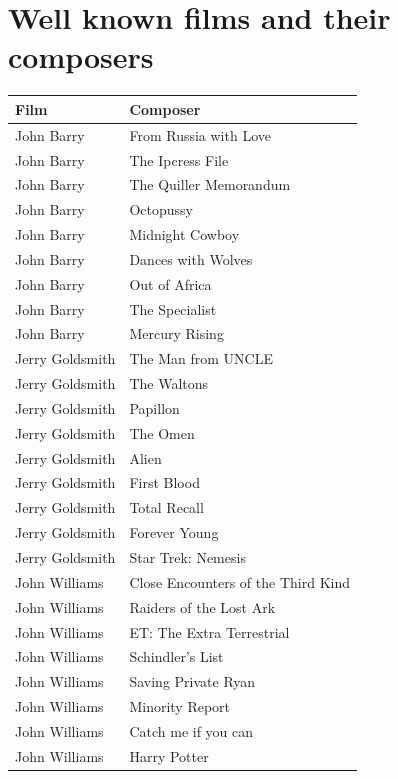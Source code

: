 \section{Well known films and their composers}
 
\begin{table}[H]
\begin{tabular}{|p{5.0cm}|p{8.0cm}|}
\hline
Film & Composer \\\hline
John Barry &  From Russia with Love   \\\hline
John Barry &  The Ipcress File  \\\hline
John Barry &  The Quiller Memorandum   \\\hline
John Barry &  Octopussy   \\\hline
John Barry &  Midnight Cowboy   \\\hline
John Barry &  Dances with Wolves   \\\hline
John Barry &  Out of Africa   \\\hline
John Barry &  The Specialist   \\\hline
John Barry &  Mercury Rising   \\\hline
Jerry Goldsmith &  The Man from UNCLE   \\\hline
Jerry Goldsmith &  The Waltons   \\\hline
Jerry Goldsmith &  Papillon   \\\hline
Jerry Goldsmith &  The Omen   \\\hline
Jerry Goldsmith &  Alien   \\\hline
Jerry Goldsmith &  First Blood   \\\hline
Jerry Goldsmith &  Total Recall   \\\hline
Jerry Goldsmith &  Forever Young   \\\hline
Jerry Goldsmith &  Star Trek: Nemesis   \\\hline
John Williams & Close Encounters of the Third Kind    \\\hline
John Williams & Raiders of the Lost Ark    \\\hline
John Williams & ET: The Extra Terrestrial    \\\hline
John Williams & Schindler's List    \\\hline
John Williams & Saving Private Ryan    \\\hline
John Williams & Minority Report    \\\hline
John Williams & Catch me if you can    \\\hline
John Williams & Harry Potter    \\\hline

\end{tabular}
\end{table}
